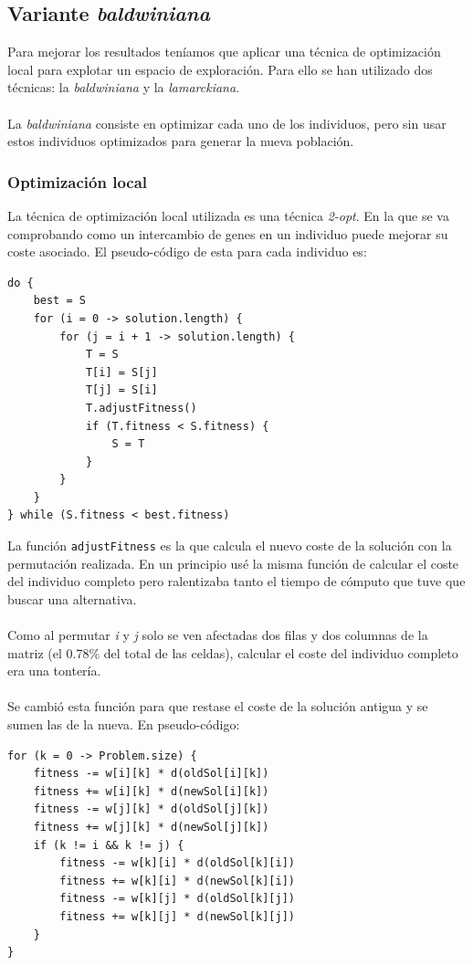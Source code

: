 \subsection{Variante \textit{baldwiniana}}

Para mejorar los resultados teníamos que aplicar una técnica de optimización local para explotar un espacio de exploración. Para ello se han utilizado dos técnicas: la \textit{baldwiniana} y la \textit{lamarckiana}.
\\ \\
La \textit{baldwiniana} consiste en optimizar cada uno de los individuos, pero sin usar estos individuos optimizados para generar la nueva población.

\label{sec:opt-local}
\subsubsection{Optimización local}

La técnica de optimización local utilizada es una técnica \textit{2-opt}. En la que se va comprobando como un intercambio de genes en un individuo puede mejorar su coste asociado. El pseudo-código de esta para cada individuo es:

\begin{lstlisting}
do {
	best = S
	for (i = 0 -> solution.length) {
		for (j = i + 1 -> solution.length) {
			T = S
			T[i] = S[j]
			T[j] = S[i]
			T.adjustFitness()
			if (T.fitness < S.fitness) {
				S = T
			}
		}
	}
} while (S.fitness < best.fitness)
\end{lstlisting}

La función \texttt{adjustFitness} es la que calcula el nuevo coste de la solución con la permutación realizada. En un principio usé la misma función de calcular el coste del individuo completo pero ralentizaba tanto el tiempo de cómputo que tuve que buscar una alternativa.
\\ \\
Como al permutar \textit{i} y \textit{j} solo se ven afectadas dos filas y dos columnas de la matriz (el 0.78\% del total de las celdas), calcular el coste del individuo completo era una tontería.
\\ \\
Se cambió esta función para que restase el coste de la solución antigua y se sumen las de la nueva. En pseudo-código:

\begin{lstlisting}
for (k = 0 -> Problem.size) {
	fitness -= w[i][k] * d(oldSol[i][k])
	fitness += w[i][k] * d(newSol[i][k])
	fitness -= w[j][k] * d(oldSol[j][k])
	fitness += w[j][k] * d(newSol[j][k])
	if (k != i && k != j) {
		fitness -= w[k][i] * d(oldSol[k][i])
		fitness += w[k][i] * d(newSol[k][i])
		fitness -= w[k][j] * d(oldSol[k][j])
		fitness += w[k][j] * d(newSol[k][j])
	}
}
\end{lstlisting}

